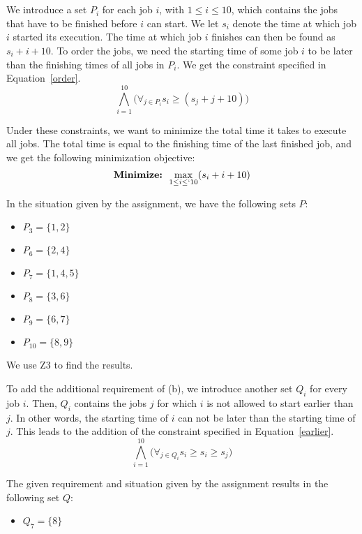 \chapter{}\label{chp:3}
We introduce a set $P_i$ for each job $i$, with $1 \leq i \leq 10$, which contains the jobs that have to be finished before $i$ can start. We let $s_i$ denote the time at which job $i$ started its execution. The time at which job $i$ finishes can then be found as $s_i + i + 10$. To order the jobs, we need the starting time of some job $i$ to be later than the finishing times of all jobs in $P_i$. We get the constraint specified in Equation~\ref{order}.
\begin{equation}
    \label{order}
    \bigwedge^{10}_{i=1}\big(\forall_{j\in P_i} s_i \geq (s_j + j + 10)\big)
\end{equation}

Under these constraints, we want to minimize the total time it takes to execute all jobs. The total time is equal to the finishing time of the last finished job, and we get the following minimization objective:
\begin{equation}
    \textbf{Minimize: }\max_{1\leq i \leq`10}(s_i + i + 10)
\end{equation}

In the situation given by the assignment, we have the following sets $P$:
\begin{itemize}
    \item $P_3 = \{1,2\}$
    \item $P_6 = \{2,4\}$
    \item $P_7 = \{1,4,5\}$
    \item $P_8 = \{3,6\}$
    \item $P_9 = \{6,7\}$
    \item $P_{10} = \{8,9\}$
\end{itemize}
We use Z3 to find the results.

To add the additional requirement of (b), we introduce another set $Q_i$ for every job $i$. Then, $Q_i$ contains the jobs $j$ for which $i$ is not allowed to start earlier than $j$. In other words, the starting time of $i$ can not be later than the starting time of $j$. This leads to the addition of the constraint specified in Equation~\ref{earlier}.
\begin{equation}
    \label{earlier}
    \bigwedge^{10}_{i=1}\big(\forall_{j\in Q_i} s_i \geq s_i \geq s_j \big)
\end{equation}

The given requirement and situation given by the assignment results in the following set $Q$:
\begin{itemize}
    \item $Q_7 = \{8\}$
\end{itemize}


